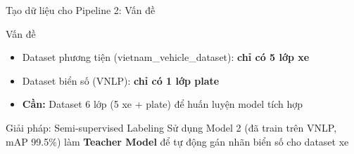 \begin{frame}{Tạo dữ liệu cho Pipeline 2: Vấn đề}
    \begin{alertblock}{Vấn đề}
    \begin{itemize}
        \item Dataset phương tiện (vietnam\_vehicle\_dataset): \textbf{chỉ có 5 lớp xe}
        \item Dataset biển số (VNLP): \textbf{chỉ có 1 lớp plate}
        \item \textbf{Cần:} Dataset 6 lớp (5 xe + plate) để huấn luyện model tích hợp
    \end{itemize}
    \end{alertblock}

    \begin{block}{Giải pháp: Semi-supervised Labeling}
    Sử dụng Model 2 (đã train trên VNLP, mAP 99.5\%) làm \textbf{Teacher Model} để tự động gán nhãn biển số cho dataset xe
    \end{block}
\end{frame}

